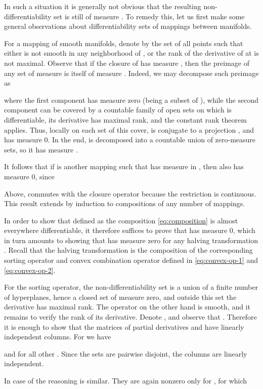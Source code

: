 \documentclass{article}
\begin{document}
In such a situation it is generally not obvious that the resulting non-differentiability set is still of measure . To remedy this, let us first make some general observations about differentiability sets of mappings between manifolds. 

For a mapping  of smooth manifolds, denote by  the set of all points  such that either  is not smooth in any neighborhood of , or the rank of the derivative of  at  is not maximal. Observe that if the closure  of  has measure , then the preimage  of any set  of measure  is itself of measure . Indeed, we may decompose such preimage as

where the first component has measure zero (being a subset of ), while the second component can be covered by a countable family of open sets on which  is differentiable, its derivative has maximal rank, and the constant rank theorem applies. Thus, locally on each set  of this cover,  is conjugate to a projection , and  has measure 0. In the end,  is decomposed into a countable union of zero-measure sets, so it has measure .

It follows that if  is another mapping such that  has measure  in , then  also has measure 0, since


Above,  commutes with the closure operator because the restriction  is continuous. This result extends by induction to compositions of any number of mappings.

In order to show that  defined as the composition \eqref{eq:composition} is almost everywhere differentiable, it therefore suffices to prove that  has measure 0, which in turn amounts to showing that  has measure zero for any halving transformation . Recall that the halving transformation is the composition of the corresponding sorting operator and convex combination operator  defined in \eqref{eq:convex-op-1} and \eqref{eq:convex-op-2}. 

For the sorting operator, the non-differentiability set is a union of a finite number of hyperplanes, hence a closed set of measure zero, and outside this set the derivative has maximal rank. The operator  on the other hand is smooth, and it remains to verify the rank of its derivative. Denote , and observe that . Therefore it is enough to show that the matrices of partial derivatives  and  have linearly independent columns.
For  we have

and  for all other . Since the sets  are pairwise disjoint, the columns are linearly independent.

In case of  the reasoning is similar. They are again nonzero only for  , for which
\end{document}
